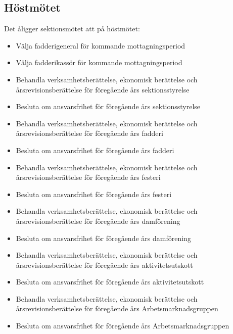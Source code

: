 \documentclass{datateknologsektionen-document}
\begin{document}
\subsection{Höstmötet}
Det åligger sektionsmötet att på höstmötet:
\begin{itemize}
  \item Välja fadderigeneral för kommande mottagningsperiod
  \item Välja fadderikassör för kommande mottagningsperiod
  \item Behandla verksamhetsberättelse, ekonomisk berättelse och årsrevisionsberättelse för föregående års sektionsstyrelse
  \item Besluta om ansvarsfrihet för föregående års sektionsstyrelse
  \item Behandla verksamhetsberättelse, ekonomisk berättelse och årsrevisionsberättelse för föregående års fadderi
  \item Besluta om ansvarsfrihet för föregående års fadderi
  \item Behandla verksamhetsberättelse, ekonomisk berättelse och årsrevisionsberättelse för föregående års festeri
  \item Besluta om ansvarsfrihet för föregående års festeri
  \item Behandla verksamhetsberättelse, ekonomisk berättelse och årsrevisionsberättelse för föregående års damförening
  \item Besluta om ansvarsfrihet för föregående års damförening
  \item Behandla verksamhetsberättelse, ekonomisk berättelse och årsrevisionsberättelse för föregående års aktivitetsutskott
  \item Besluta om ansvarsfrihet för föregående års aktivitetsutskott
  \item Behandla verksamhetsberättelse, ekonomisk berättelse och årsrevisionsberättelse för föregående års Arbetsmarknadsgruppen
  \item Besluta om ansvarsfrihet för föregående års Arbetsmarknadsgruppen
\end{itemize}
\end{document}
